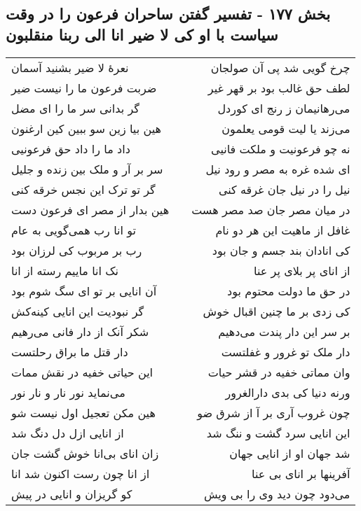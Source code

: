 \begin{center}
\section*{بخش ۱۷۷ - تفسیر گفتن ساحران فرعون را در وقت سیاست با او کی لا ضیر انا الی ربنا منقلبون}
\label{sec:sh177}
\begin{longtable}{l p{0.5cm} r}
نعرهٔ لا ضیر بشنید آسمان
&&
چرخ گویی شد پی آن صولجان
\\
ضربت فرعون ما را نیست ضیر
&&
لطف حق غالب بود بر قهر غیر
\\
گر بدانی سر ما را ای مضل
&&
می‌رهانیمان ز رنج ای کوردل
\\
هین بیا زین سو ببین کین ارغنون
&&
می‌زند یا لیت قومی یعلمون
\\
داد ما را داد حق فرعونیی
&&
نه چو فرعونیت و ملکت فانیی
\\
سر بر آر و ملک بین زنده و جلیل
&&
ای شده غره به مصر و رود نیل
\\
گر تو ترک این نجس خرقه کنی
&&
نیل را در نیل جان غرقه کنی
\\
هین بدار از مصر ای فرعون دست
&&
در میان مصر جان صد مصر هست
\\
تو انا رب همی‌گویی به عام
&&
غافل از ماهیت این هر دو نام
\\
رب بر مربوب کی لرزان بود
&&
کی انادان بند جسم و جان بود
\\
نک انا ماییم رسته از انا
&&
از انای پر بلای پر عنا
\\
آن انایی بر تو ای سگ شوم بود
&&
در حق ما دولت محتوم بود
\\
گر نبودیت این انایی کینه‌کش
&&
کی زدی بر ما چنین اقبال خوش
\\
شکر آنک از دار فانی می‌رهیم
&&
بر سر این دار پندت می‌دهیم
\\
دار قتل ما براق رحلتست
&&
دار ملک تو غرور و غفلتست
\\
این حیاتی خفیه در نقش ممات
&&
وان مماتی خفیه در قشر حیات
\\
می‌نماید نور نار و نار نور
&&
ورنه دنیا کی بدی دارالغرور
\\
هین مکن تعجیل اول نیست شو
&&
چون غروب آری بر آ از شرق ضو
\\
از انایی ازل دل دنگ شد
&&
این انایی سرد گشت و ننگ شد
\\
زان انای بی‌انا خوش گشت جان
&&
شد جهان او از انایی جهان
\\
از انا چون رست اکنون شد انا
&&
آفرینها بر انای بی عنا
\\
کو گریزان و انایی در پیش
&&
می‌دود چون دید وی را بی ویش
\\

\end{longtable}
\end{center}
